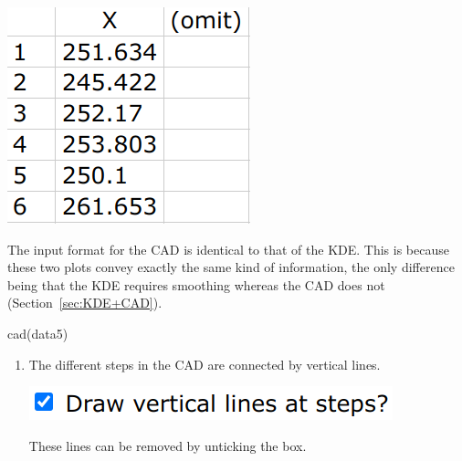 \begin{refsection}
\noindent\begin{minipage}[t]{.2\linewidth}
  \strut\vspace*{-\baselineskip}\newline
  \includegraphics[width=\linewidth]{../figures/OtherKDEdata.png}
\end{minipage}
\begin{minipage}[t]{.8\linewidth}
The input format for the CAD is identical to that of the KDE. This is
because these two plots convey exactly the same kind of information,
the only difference being that the KDE requires smoothing whereas the
CAD does not (Section~\ref{sec:KDE+CAD}).
\end{minipage}

\begin{console}
cad(data5)
\end{console}

\begin{enumerate}

\item The different steps in the CAD are connected by vertical lines.

\noindent\begin{minipage}[t]{.3\linewidth}
\strut\vspace*{-\baselineskip}\newline
\includegraphics[width=\linewidth]{../figures/UPbCADverticals.png}
\end{minipage}
\begin{minipage}[t]{.7\linewidth}
  These lines can be removed by unticking the box.
\end{minipage}


\end{enumerate}
\end{refsection}
